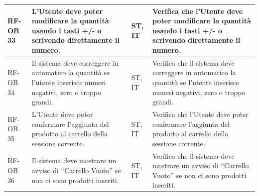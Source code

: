 \documentclass[a4paper,11pt,oneside]{scrartcl}
\begin{document}
\begin{longtable}{|p{1.5cm}|p{4.5cm}|p{1.8cm}|p{6cm}|}
    RF-OB 33         & L'Utente deve poter modificare la quantità usando i tasti +/- o scrivendo direttamente il numero.                                                                                                                                                                                                     & ST, IT             & Verifica che l'Utente deve poter modificare la quantità usando i tasti +/- o scrivendo direttamente il numero.                                                                                                                                                                                                     \\ \hline
    RF-OB 34         & Il sistema deve correggere in automatico la quantità se l'utente inserisce numeri negativi, zero o troppo grandi.                                                                                                                                                                                     & ST, IT             & Verifica che il sistema deve correggere in automatico la quantità se l'utente inserisce numeri negativi, zero o troppo grandi.                                                                                                                                                                                     \\ \hline
    RF-OB 35         & L'Utente deve poter confermare l'aggiunta del prodotto al carrello della sessione corrente.                                                                                                                                                                                                           & ST, IT             & Verifica che l'Utente deve poter confermare l'aggiunta del prodotto al carrello della sessione corrente.                                                                                                                                                                                                           \\ \hline
    RF-OB 36         & Il sistema deve mostrare un avviso di ``Carrello Vuoto'' se non ci sono prodotti inseriti.                                                                                                                                                                                                            & ST, IT             & Verifica che il sistema deve mostrare un avviso di ``Carrello Vuoto'' se non ci sono prodotti inseriti.                                                                                                                                                                                                            \\ \hline

\end{longtable}
\end{document}
